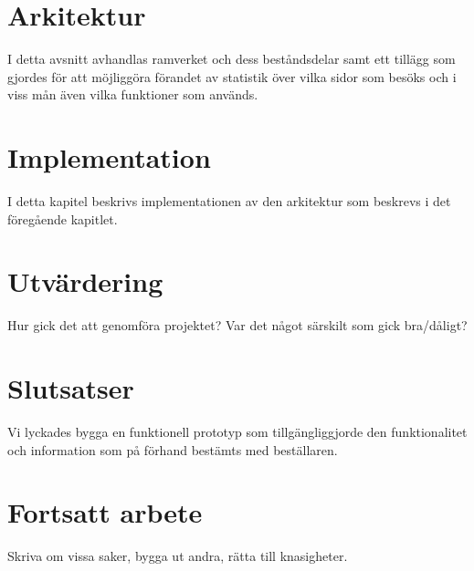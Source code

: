 \documentclass[11pt,a4paper]{report}
\begin{document}



\chapter{Arkitektur}
I detta avsnitt avhandlas ramverket och dess beståndsdelar samt ett
tillägg som gjordes för att möjliggöra förandet av statistik över vilka
sidor som besöks och i viss mån även vilka funktioner som används.



\chapter{Implementation}
I detta kapitel beskrivs implementationen av den arkitektur som beskrevs
i det föregående kapitlet.






\chapter{Utvärdering}
Hur gick det att genomföra projektet? Var det något särskilt som gick
bra/dåligt?




\chapter{Slutsatser}
Vi lyckades bygga en funktionell prototyp som tillgängliggjorde den
funktionalitet och information som på förhand bestämts med beställaren.




\chapter{Fortsatt arbete}
Skriva om vissa saker, bygga ut andra, rätta till knasigheter.

\end{document}
